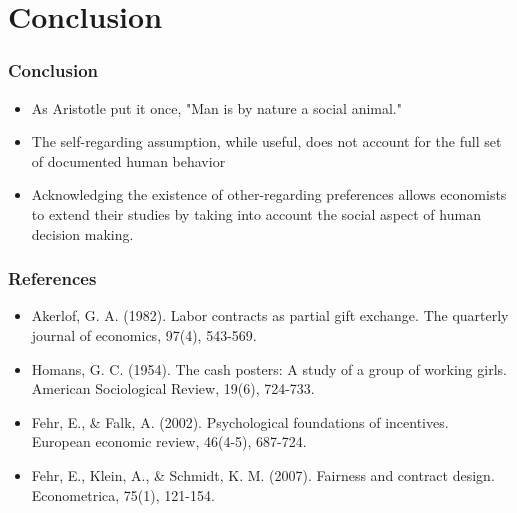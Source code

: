 \documentclass{beamer}
\begin{document}
\section{Conclusion}

\begin{frame}
	\frametitle{Conclusion}
	\begin{itemize}
		\item As Aristotle put it once, "Man is by nature a social animal."
		\item The self-regarding assumption, while useful, does not account for the full set of documented human behavior
		\item Acknowledging the existence of other-regarding preferences allows economists to extend their studies by taking into account the social aspect of human decision making.
	\end{itemize}
\end{frame}


\begin{frame}
	\frametitle{References}
	\begin{itemize}
		\item Akerlof, G. A. (1982). Labor contracts as partial gift exchange. The quarterly journal of economics, 97(4), 543-569.
		\item Homans, G. C. (1954). The cash posters: A study of a group of working girls. American Sociological Review, 19(6), 724-733.
		\item Fehr, E., \& Falk, A. (2002). Psychological foundations of incentives. European economic review, 46(4-5), 687-724.
		\item Fehr, E., Klein, A., \& Schmidt, K. M. (2007). Fairness and contract design. Econometrica, 75(1), 121-154.
	\end{itemize}
\end{frame}
\end{document}
